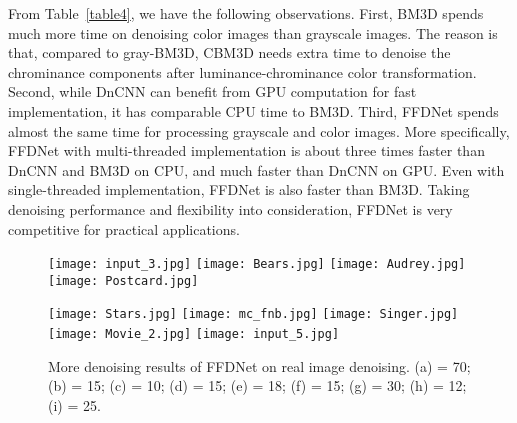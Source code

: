 \documentclass[journal]{IEEEtran}
\begin{document}
From Table~\ref{table4}, we have the following observations. First, BM3D spends much more time on denoising color images than grayscale images. The reason is that, compared to gray-BM3D, CBM3D needs extra time to denoise the chrominance components after luminance-chrominance color transformation. Second, while DnCNN can benefit from GPU computation for fast implementation, it has comparable CPU time to BM3D. Third, FFDNet spends almost the same time for processing grayscale and color images. More specifically, FFDNet with multi-threaded implementation is about three times faster than DnCNN and BM3D on CPU, and much faster than DnCNN on GPU. Even with single-threaded implementation, FFDNet is also faster than BM3D. Taking denoising performance and flexibility into consideration, FFDNet is very competitive for practical applications.







\begin{figure*}[!htbp]
\begin{center}
\subfigure
{\texttt{[image: input\_3.jpg]}}
\subfigure
{\texttt{[image: Bears.jpg]}}
\subfigure
{\texttt{[image: Audrey.jpg]}}
\subfigure
{\texttt{[image: Postcard.jpg]}}\setcounter{subfigure}{0}

\subfigure
{\texttt{[image: Stars.jpg]}}
\subfigure
{\texttt{[image: mc\_fnb.jpg]}}
\subfigure
{\texttt{[image: Singer.jpg]}}
\subfigure
{\texttt{[image: Movie\_2.jpg]}}
\subfigure
{\texttt{[image: input\_5.jpg]}}\setcounter{subfigure}{4}
\caption{More denoising results of FFDNet on real image denoising. (a)  = 70; (b)  = 15; (c)  = 10; (d)  = 15; (e)  = 18; (f)  = 15; (g)  = 30;  (h)  = 12; (i)  = 25.}\label{fig_rn3}
\end{center}\end{figure*}
\end{document}
